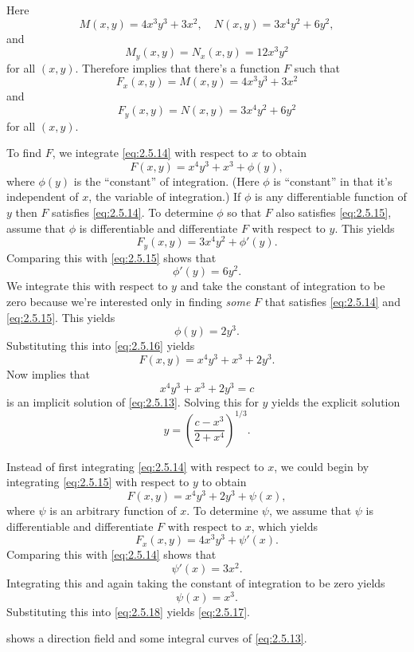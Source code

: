 \begin{solution}
Here
\[
M(x,y)=4x^3y^3+3x^2,\quad N(x,y)=3x^4y^2+6y^2,
\]
and
\[
M_y(x,y)=N_x(x,y)=12 x^3y^2
\]
for all $(x,y)$.
Therefore
 implies that there's a function $F$ such that
\begin{equation} \label{eq:2.5.14}
F_x(x,y)=M(x,y)=4x^3y^3+3x^2
\end{equation}
 and
\begin{equation} \label{eq:2.5.15}
F_y(x,y)=N(x,y)=3x^4y^2+6y^2
\end{equation}
 for all $(x,y)$.

\begin{enumext}[label=\arabic*,wrap-label={(Method #1)},labelwidth=5em,list-indent=0pt]
\item To find $F$, we integrate \eqref{eq:2.5.14} with
respect to $x$ to obtain
\begin{equation} \label{eq:2.5.16}
F(x,y)=x^4y^3+x^3+\phi(y),
\end{equation}
 where $\phi (y)$ is the ``constant'' of integration.  (Here
$\phi$ is ``constant'' in  that it's independent of $x$, the
variable of integration.)  If $\phi$ is any differentiable function of
$y$ then $F$  satisfies \eqref{eq:2.5.14}.  To
determine $\phi$ so that
$F$ also satisfies \eqref{eq:2.5.15}, assume that $\phi$ is
differentiable and differentiate $F$ with respect to $y$.
This yields
\[
F_y(x,y)=3x^4y^2+\phi'(y).
\]
 Comparing this with \eqref{eq:2.5.15} shows that
\[
\phi'(y)=6y^2.
\]
 We integrate this with respect to $y$ and take the
constant of integration to be zero because we're interested only in
finding \emph{\color{blue}some} $F$ that satisfies \eqref{eq:2.5.14} and
\eqref{eq:2.5.15}. This  yields
\[
\phi (y)=2y^3.
\]
Substituting this into \eqref{eq:2.5.16} yields
\begin{equation} \label{eq:2.5.17}
F(x,y)=x^4y^3+x^3+2y^3.
\end{equation}
Now  implies that
\[
x^4y^3+x^3+2y^3=c
\]
is an implicit solution of \eqref{eq:2.5.13}. Solving this for $y$
yields the explicit solution
\[
y=\left(\frac{c-x^3}{2+x^4}\right)^{1/3}.
\]

\item Instead of first integrating
\eqref{eq:2.5.14}
with respect to $x$, we could begin by integrating \eqref{eq:2.5.15} with
respect to $y$ to obtain
\begin{equation} \label{eq:2.5.18}
F(x,y)=x^4y^3+2y^3+\psi (x),
\end{equation}
 where $\psi$ is an arbitrary  function of
$x$.  To determine $\psi$, we assume that $\psi$ is
differentiable and differentiate $F$ with respect to $x$,
which yields
\[
F_x(x,y)=4x^3y^3+\psi'(x).
\]
 Comparing this with \eqref{eq:2.5.14} shows that
\[
\psi'(x)=3x^2.
\]
Integrating this and again taking  the constant of
integration to be zero yields
\[
\psi(x)=x^3.
\]
 Substituting this into \eqref{eq:2.5.18} yields \eqref{eq:2.5.17}.
\end{enumext}

 shows a direction field and  some
integral curves of \eqref{eq:2.5.13}.
\end{solution}

